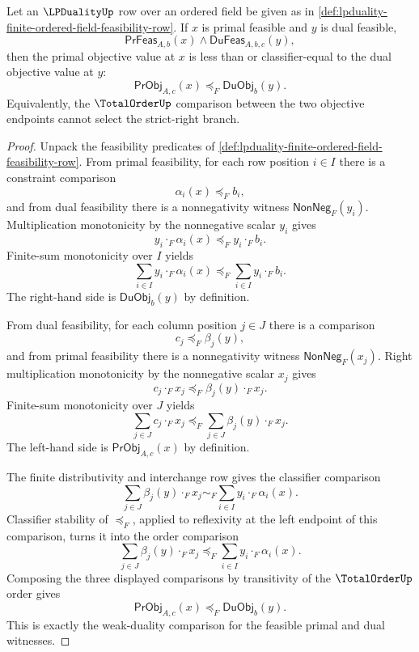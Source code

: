 \begin{theorem}
\label{thm:lpduality-feasible-weak-duality}
Let an $\LPDualityUp$ row over an ordered field be given as in \autoref{def:lpduality-finite-ordered-field-feasibility-row}. If $x$ is primal feasible and $y$ is dual feasible,
$$
\mathsf{PrFeas}_{A,b}(x)\land\mathsf{DuFeas}_{A,b,c}(y),
$$
then the primal objective value at $x$ is less than or classifier-equal to the dual objective value at $y$:
$$
\mathsf{PrObj}_{A,c}(x)\preceq_F\mathsf{DuObj}_{b}(y).
$$
Equivalently, the $\TotalOrderUp$ comparison between the two objective endpoints cannot select the strict-right branch.
\end{theorem}
\begin{proof}
Unpack the feasibility predicates of \autoref{def:lpduality-finite-ordered-field-feasibility-row}. From primal feasibility, for each row position $i\in I$ there is a constraint comparison
$$
\alpha_i(x)\preceq_F b_i,
$$
and from dual feasibility there is a nonnegativity witness $\mathsf{NonNeg}_F(y_i)$. Multiplication monotonicity by the nonnegative scalar $y_i$ gives
$$
y_i\cdot_F\alpha_i(x)\preceq_F y_i\cdot_Fb_i.
$$
Finite-sum monotonicity over $I$ yields
$$
\sum_{i\in I}y_i\cdot_F\alpha_i(x)
\preceq_F
\sum_{i\in I}y_i\cdot_Fb_i.
$$
The right-hand side is $\mathsf{DuObj}_{b}(y)$ by definition.

From dual feasibility, for each column position $j\in J$ there is a comparison
$$
c_j\preceq_F\beta_j(y),
$$
and from primal feasibility there is a nonnegativity witness $\mathsf{NonNeg}_F(x_j)$. Right multiplication monotonicity by the nonnegative scalar $x_j$ gives
$$
c_j\cdot_Fx_j\preceq_F\beta_j(y)\cdot_Fx_j.
$$
Finite-sum monotonicity over $J$ yields
$$
\sum_{j\in J}c_j\cdot_Fx_j
\preceq_F
\sum_{j\in J}\beta_j(y)\cdot_Fx_j.
$$
The left-hand side is $\mathsf{PrObj}_{A,c}(x)$ by definition.

The finite distributivity and interchange row gives the classifier comparison
$$
\sum_{j\in J}\beta_j(y)\cdot_Fx_j
\sim_F
\sum_{i\in I}y_i\cdot_F\alpha_i(x).
$$
Classifier stability of $\preceq_F$, applied to reflexivity at the left endpoint of this comparison, turns it into the order comparison
$$
\sum_{j\in J}\beta_j(y)\cdot_Fx_j
\preceq_F
\sum_{i\in I}y_i\cdot_F\alpha_i(x).
$$
Composing the three displayed comparisons by transitivity of the $\TotalOrderUp$ order gives
$$
\mathsf{PrObj}_{A,c}(x)
\preceq_F
\mathsf{DuObj}_{b}(y).
$$
This is exactly the weak-duality comparison for the feasible primal and dual witnesses.
\end{proof}

